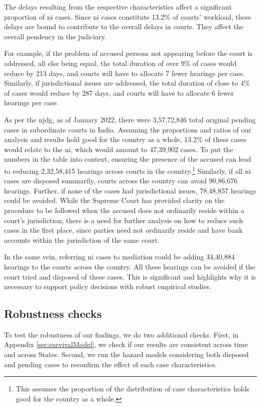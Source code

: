 The delays resulting from the respective characteristics affect a significant proportion of \gls{ni} cases. Since \gls{ni} cases constitute 13.2\% of courts' workload, these delays are bound to contribute to the overall delays in courts. They affect the overall pendency in the judiciary. 

For example, if the problem of accused persons not appearing before the court is addressed, all else being equal, the total duration of over 9\% of cases would reduce by 213 days, and courts will have to allocate 7 fewer hearings per case. Similarly, if jurisdictional issues are addressed, the total duration of close to 4\% of cases would reduce by 287 days, and courts will have to allocate 6 fewer hearings per case.

As per the \gls{njdg}, as of January 2022, there were 3,57,72,846 total original pending cases in subordinate courts in India. Assuming the proportions and ratios of our analysis and results hold good for the country as a whole, 13.2\% of these cases would relate to the \gls{ni}, which would amount to 47,39,902 cases. To put the numbers in the table into context, ensuring the presence of the accused can lead to reducing 2,32,58,415 hearings across courts in the country.\footnote{This assumes the proportion of the distribution of case characteristics holds good for the country as a whole.} Similarly, if all \gls{ni} cases are disposed summarily, courts across the country can avoid 90,86,676 hearings. Further, if none of the cases had jurisdictional issues, 78,48,857 hearings could be avoided. While the Supreme Court has provided clarity on the procedure to be followed when the accused does not ordinarily reside within a court's jurisdiction, there is a need for further analysis on how to reduce such cases in the first place, since parties need not ordinarily reside and have bank accounts within the jurisdiction of the same court.

In the same vein, referring \gls{ni} cases to mediation could be adding 34,40,884 hearings to the courts across the country. All these hearings can be avoided if the court tried and disposed of these cases. This is significant and highlights why it is necessary to support policy decisions with robust empirical studies.

\subsection{Robustness checks}

To test the robustness of our findings, we do two additional checks. First, in Appendix \ref{sec:survivalModel}, we check if our results are consistent across time and across States. Second, we run the hazard models considering both disposed and pending cases to reconfirm the effect of each case characteristics.


